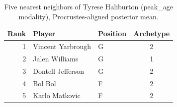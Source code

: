 \begin{table}[htbp]
  \centering\small
  \begin{tabular}{rllc}
    \toprule
    Rank & Player & Position & Archetype \\
    \midrule
    1 & Vincent Yarbrough & G & 2 \\
    2 & Jalen Williams & G & 1 \\
    3 & Dontell Jefferson & G & 2 \\
    4 & Bol Bol & F & 2 \\
    5 & Karlo Matkovic & F & 2 \\
    \bottomrule
  \end{tabular}
  \caption{Five nearest neighbors of Tyrese Haliburton (peak_age modality), Procrustes-aligned posterior mean.}
  \label{tab:Tyrese_Haliburton_neighbors_peak_age}
\end{table}

